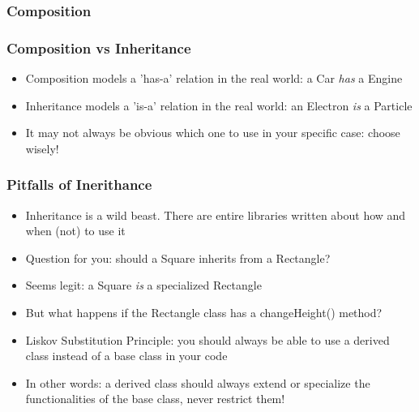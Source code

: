 \documentclass[9pt]{beamer}
\begin{document}
\begin{frame}
  \frametitle{Composition}
  
\end{frame}


\begin{frame}
  \frametitle{Composition vs Inheritance}

  \begin{itemize}
    \item Composition models a \alert{'has-a'} relation in the real world: a
          Car \emph{has} a Engine
    \medskip
    \item Inheritance models a \alert{'is-a'} relation in the real world: an
          Electron \emph{is} a Particle
    \medskip
    \item It may not always be obvious which one to use in your specific case:
          choose wisely!
  \end{itemize}

\end{frame}



\begin{frame}
  \frametitle{Pitfalls of Inerithance}

  \begin{itemize}
    \item Inheritance is a wild beast. There are entire libraries written about how and when (not) to use it

    \bigskip

    \item Question for you: should a Square inherits from a Rectangle?
    \item Seems legit: a Square \emph{is} a specialized Rectangle
    \item But what happens if the Rectangle class has a changeHeight() method?
    \bigskip

    \bigskip

    \item \alert{Liskov Substitution Principle}: you should always be able to use
          a derived class instead of a base class in your code
    \item In other words: a derived class should always extend or specialize
          the functionalities of the base class, never restrict them!
   \end{itemize}

\end{frame}
\end{document}
